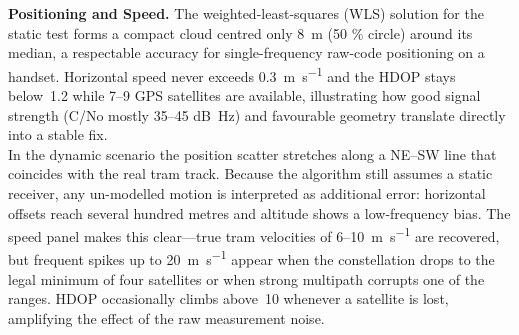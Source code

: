         \vspace{0.5em}
        \textbf{Positioning and Speed.} 
        The weighted-least-squares (WLS) solution for the static test forms a compact cloud
        centred only \SI{8}{\metre} (50 \% circle) around its median, a respectable accuracy for
        single-frequency raw-code positioning on a handset.  Horizontal speed never exceeds
        \SI{0.3}{\metre\per\second} and the HDOP stays below~1.2 while 7–9 GPS satellites are
        available, illustrating how good signal strength
        (C/No mostly 35–45 \si{dB\hertz}) and favourable geometry translate directly into a stable
        fix.\\[2pt]
        In the dynamic scenario the position scatter stretches along a NE--SW line that coincides
        with the real tram track.  Because the algorithm still assumes a static receiver, any
        un-modelled motion is interpreted as additional error: horizontal offsets reach several
        hundred metres and altitude shows a low-frequency bias.  The speed panel makes this
        clear—true tram velocities of 6–\SI{10}{\metre\per\second} are recovered, but frequent
        spikes up to \SI{20}{\metre\per\second} appear when the constellation drops to the legal
        minimum of four satellites or when strong multipath corrupts one of the ranges.
        HDOP occasionally climbs above~10 whenever a satellite is lost, amplifying the effect of
        the raw measurement noise.


